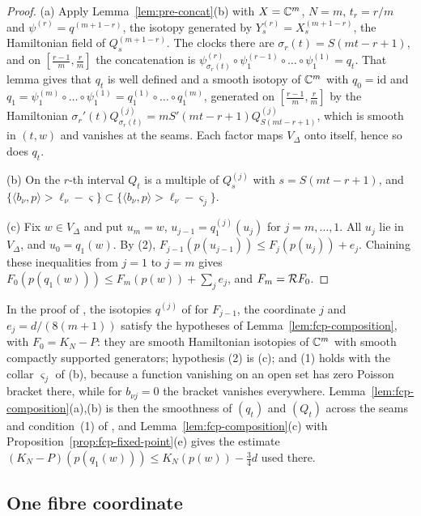 \begin{proof}
(a) Apply Lemma~\ref{lem:pre-concat}(b) with $X=\mathbb{C}^m$, $N=m$, $t_r=r/m$ and $\psi^{(r)}=q^{(m+1-r)}$, the isotopy
generated by $Y^{(r)}_s=X^{(m+1-r)}_s$, the Hamiltonian field of $Q^{(m+1-r)}_s$. The clocks there are
$\sigma_r(t)=S(mt-r+1)$, and on $[\frac{r-1}m,\frac rm]$ the concatenation is
$\psi^{(r)}_{\sigma_r(t)}\circ\psi^{(r-1)}_1\circ\dots\circ\psi^{(1)}_1=q_t$. That lemma gives that $q_t$ is well
defined and a smooth isotopy of $\mathbb{C}^m$ with $q_0=\mathrm{id}$ and $q_1=\psi^{(m)}_1\circ\dots\circ\psi^{(1)}_1
=q^{(1)}_1\circ\dots\circ q^{(m)}_1$, generated on $[\frac{r-1}m,\frac rm]$ by the Hamiltonian
$\sigma_r'(t)Q^{(j)}_{\sigma_r(t)}=mS'(mt-r+1)Q^{(j)}_{S(mt-r+1)}$, which is smooth in $(t,w)$ and vanishes at the
seams. Each factor maps $V_\Delta$ onto itself, hence so does $q_t$.

(b) On the $r$-th interval $Q_t$ is a multiple of $Q^{(j)}_{s}$ with $s=S(mt-r+1)$, and
$\{\langle b_\nu,p\rangle>\ell_\nu-\varsigma\}\subset\{\langle b_\nu,p\rangle>\ell_\nu-\varsigma_j\}$.

(c) Fix $w\in V_\Delta$ and put $u_m=w$, $u_{j-1}=q^{(j)}_1(u_j)$ for $j=m,\dots,1$. All $u_j$ lie in $V_\Delta$, and
$u_0=q_1(w)$. By (2), $F_{j-1}(p(u_{j-1}))\le F_j(p(u_j))+e_j$. Chaining these inequalities from $j=1$ to $j=m$ gives
$F_0(p(q_1(w)))\le F_m(p(w))+\sum_je_j$, and $F_m=\mathcal{R} F_0$.
\end{proof}

In the proof of , the isotopies $q^{(j)}$ of  for
$F_{j-1}$, the coordinate $j$ and $e_j=d/(8(m+1))$ satisfy the hypotheses of Lemma~\ref{lem:fcp-composition}, with
$F_0=K_N-P$: they are smooth Hamiltonian isotopies of $\mathbb{C}^m$ with smooth compactly supported generators; hypothesis
(2) is (c); and (1) holds with the collar $\varsigma_j$ of
(b), because a function vanishing on an open set has zero Poisson bracket there,
while for $b_{\nu j}=0$ the bracket vanishes everywhere. Lemma~\ref{lem:fcp-composition}(a),(b) is then the smoothness
of $(q_t)$ and $(Q_t)$ across the seams and condition~(1) of , and
Lemma~\ref{lem:fcp-composition}(c) with Proposition~\ref{prop:fcp-fixed-point}(e) gives the estimate
$(K_N-P)(p(q_1(w)))\le K_N(p(w))-\frac34d$ used there.

\subsection{One fibre coordinate}\label{sec:fcp-one}

